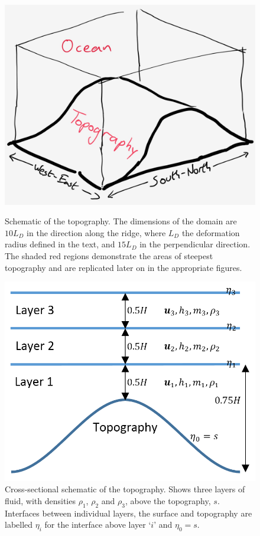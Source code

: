 \documentclass[12pt,a4paper]{report}
\begin{document}
\begin{figure}
	\centering
	\begin{minipage}[b]{0.45\linewidth}
		\includegraphics[width=\linewidth]{Topography}
		\caption{Schematic of the topography. The dimensions of the domain
			are $10 L_{D}$ in the direction along the 
			ridge, where $L_{D}$ the deformation
			radius defined in the text, and $15 L_{D}$ 
			in the perpendicular direction.
			The shaded red regions demonstrate the areas of
			steepest topography and are replicated later on in
			the appropriate figures.  }
		\label{fig:TopographySchem}
	\end{minipage}
	\quad
	\begin{minipage}[b]{0.45\linewidth}
		\includegraphics[width=\linewidth]{TopographyCross}
		\caption{ Cross-sectional schematic of the topography. 
			Shows three layers of fluid, with densities 
			$\rho_{1}$, $\rho_{2}$ and $\rho_{3}$, above the 
			topography, $s$. Interfaces between individual
			layers, the surface and topography are labelled $\eta_{i}$ for
			the interface above layer `$i$' and  $\eta_{0}=s$. }
		\label{fig:TopographyCross}
	\end{minipage}
\end{figure}
\end{document}
